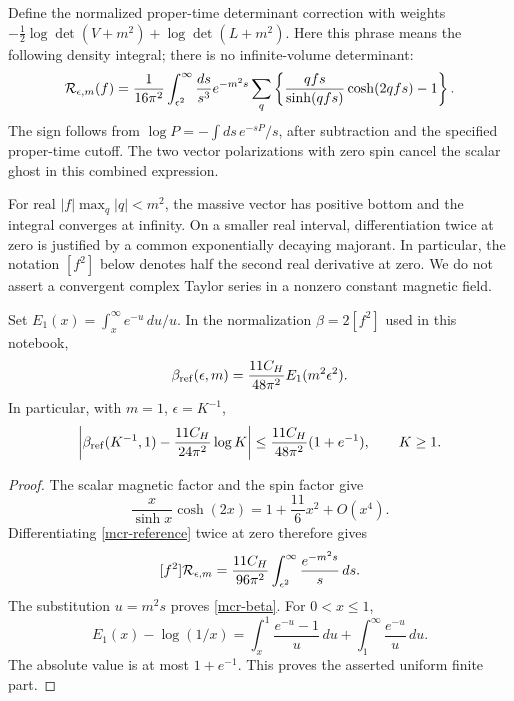 Define the normalized proper-time determinant correction
with weights \(-\tfrac12\log\det(V+m^2)+\log\det(L+m^2)\).
Here this phrase means the following density integral;
there is no infinite-volume determinant:
\begin{equation}
 {\cal R}_{\epsilon,m}(f)
 =\frac1{16\pi^2}\int_{\epsilon^2}^{\infty}
       \frac{ds}{s^3}e^{-m^2s}
       \sum_q\left\{\frac{qfs}{\sinh(qfs)}
                          \cosh(2qfs)-1\right\}.
 \label{mcr-reference}
\end{equation}
The sign follows from
\(\log P=-\int ds\,e^{-sP}/s\), after subtraction and
the specified proper-time cutoff. The two vector
polarizations with zero spin cancel the scalar ghost
in this combined expression.

For real \(|f|\max_q|q|<m^2\), the massive vector has
positive bottom and the integral converges at infinity.
On a smaller real interval, differentiation twice at
zero is justified by a common exponentially decaying
majorant. In particular, the notation \([f^2]\) below
denotes half the second real derivative at zero.
We do not assert a convergent complex Taylor series
in a nonzero constant magnetic field.

\begin{proposition}
\label{mcr-coefficient}
Set \(E_1(x)=\int_x^\infty e^{-u}\,du/u\). In the
normalization \(\beta=2[f^2]\) used in this notebook,
\begin{equation}
 \beta_{\rm ref}(\epsilon,m)
       =\frac{11C_H}{48\pi^2}E_1(m^2\epsilon^2).
 \label{mcr-beta}
\end{equation}
In particular, with \(m=1\), \(\epsilon=K^{-1}\),
\begin{equation}
 \left|\beta_{\rm ref}(K^{-1},1)
           -\frac{11C_H}{24\pi^2}\log K\right|
 \le \frac{11C_H}{48\pi^2}(1+e^{-1}),\qquad K\ge1.
 \label{mcr-finite-part}
\end{equation}
\end{proposition}

\begin{proof}
The scalar magnetic factor and the spin factor give
\[
 \frac{x}{\sinh x}\cosh(2x)
       =1+\frac{11}{6}x^2+O(x^4).
\]
Differentiating \eqref{mcr-reference} twice at zero
therefore gives
\[
 [f^2]{\cal R}_{\epsilon,m}
    =\frac{11C_H}{96\pi^2}
           \int_{\epsilon^2}^{\infty}\frac{e^{-m^2s}}s\,ds.
\]
The substitution \(u=m^2s\) proves \eqref{mcr-beta}.
For \(0<x\le1\),
\[
 E_1(x)-\log(1/x)
   =\int_x^1\frac{e^{-u}-1}{u}\,du
                  +\int_1^\infty\frac{e^{-u}}u\,du.
\]
The absolute value is at most \(1+e^{-1}\). This proves
the asserted uniform finite part.
\end{proof}

